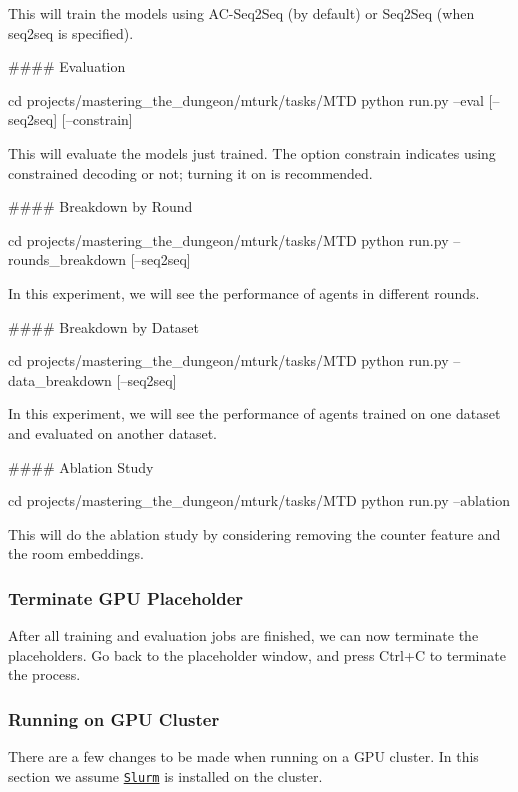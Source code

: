 This will train the models using A\+C-\/\+Seq2\+Seq (by default) or Seq2\+Seq (when seq2seq is specified).

\#\#\#\# Evaluation 
\begin{DoxyCode}
cd projects/mastering\_the\_dungeon/mturk/tasks/MTD
python run.py --eval [--seq2seq] [--constrain]
\end{DoxyCode}


This will evaluate the models just trained. The option {\ttfamily constrain} indicates using constrained decoding or not; turning it on is recommended.

\#\#\#\# Breakdown by Round 
\begin{DoxyCode}
cd projects/mastering\_the\_dungeon/mturk/tasks/MTD
python run.py --rounds\_breakdown [--seq2seq]
\end{DoxyCode}


In this experiment, we will see the performance of agents in different rounds.

\#\#\#\# Breakdown by Dataset 
\begin{DoxyCode}
cd projects/mastering\_the\_dungeon/mturk/tasks/MTD
python run.py --data\_breakdown [--seq2seq]
\end{DoxyCode}


In this experiment, we will see the performance of agents trained on one dataset and evaluated on another dataset.

\#\#\#\# Ablation Study 
\begin{DoxyCode}
cd projects/mastering\_the\_dungeon/mturk/tasks/MTD
python run.py --ablation
\end{DoxyCode}


This will do the ablation study by considering removing the counter feature and the room embeddings.

\subsubsection*{Terminate G\+PU Placeholder}

After all training and evaluation jobs are finished, we can now terminate the placeholders. Go back to the placeholder window, and press {\ttfamily Ctrl+C} to terminate the process.

\subsubsection*{Running on G\+PU Cluster}

There are a few changes to be made when running on a G\+PU cluster. In this section we assume \href{https://slurm.schedmd.com/}{\tt Slurm} is installed on the cluster.

